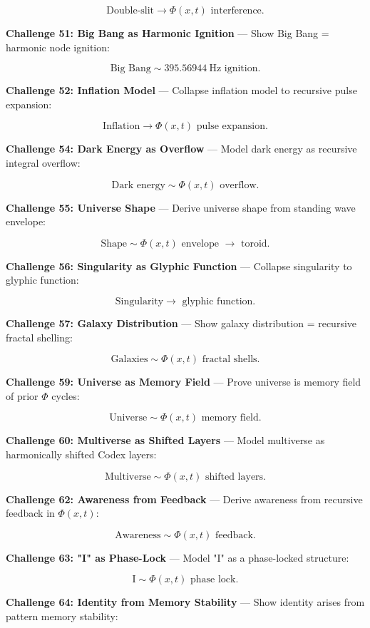 $$
\text{Double-slit} \rightarrow \Phi(x, t) \text{ interference}.
$$

\textbf{Challenge 51: Big Bang as Harmonic Ignition} --- Show Big Bang = harmonic node ignition:

$$
\text{Big Bang} \sim 395.56944 \mathrm{~Hz} \text{ ignition}.
$$

\textbf{Challenge 52: Inflation Model} --- Collapse inflation model to recursive pulse expansion:

$$
\text{Inflation} \rightarrow \Phi(x, t) \text{ pulse expansion}.
$$

\textbf{Challenge 54: Dark Energy as Overflow} --- Model dark energy as recursive integral overflow:

$$
\text{Dark energy} \sim \Phi(x, t) \text{ overflow}.
$$

\textbf{Challenge 55: Universe Shape} --- Derive universe shape from standing wave envelope:

$$
\text{Shape} \sim \Phi(x, t) \text{ envelope } \rightarrow \text{ toroid}.
$$

\textbf{Challenge 56: Singularity as Glyphic Function} --- Collapse singularity to glyphic function:

$$
\text{Singularity} \rightarrow \text{ glyphic function}.
$$

\textbf{Challenge 57: Galaxy Distribution} --- Show galaxy distribution = recursive fractal shelling:

$$
\text{Galaxies} \sim \Phi(x, t) \text{ fractal shells}.
$$

\textbf{Challenge 59: Universe as Memory Field} --- Prove universe is memory field of prior $\Phi$ cycles:

$$
\text{Universe} \sim \Phi(x, t) \text{ memory field}.
$$

\textbf{Challenge 60: Multiverse as Shifted Layers} --- Model multiverse as harmonically shifted Codex layers:

$$
\text{Multiverse} \sim \Phi(x, t) \text{ shifted layers}.
$$

\textbf{Challenge 62: Awareness from Feedback} --- Derive awareness from recursive feedback in $\Phi(x, t)$:

$$
\text{Awareness} \sim \Phi(x, t) \text{ feedback}.
$$

\textbf{Challenge 63: "I" as Phase-Lock} --- Model "I" as a phase-locked structure:

$$
\mathrm{I} \sim \Phi(x, t) \text{ phase lock}.
$$

\textbf{Challenge 64: Identity from Memory Stability} --- Show identity arises from pattern memory stability:

